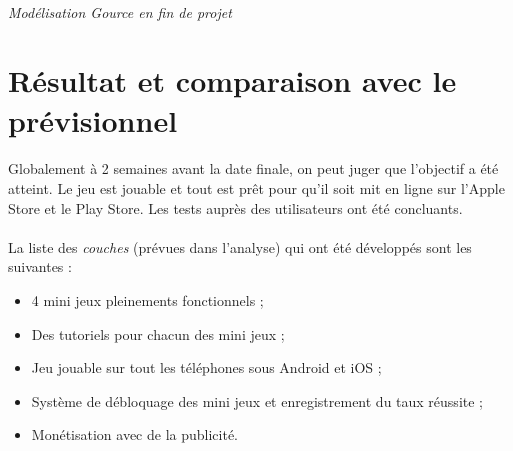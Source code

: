 \paragraph{}
\noindent
{}
\begin{center}
\textit{Modélisation Gource en fin de projet}
\end{center}

\section{Résultat et comparaison avec le prévisionnel}

\paragraph{}
Globalement à 2 semaines avant la date finale, on peut juger que l'objectif a été atteint. 
Le jeu est jouable et tout est prêt pour qu'il soit mit en ligne sur l'Apple Store et le Play Store. Les tests auprès des utilisateurs ont été concluants.

\paragraph{}
La liste des \textit{couches} (prévues dans l'analyse) qui ont été développés sont les suivantes :
\begin{itemize}
\item 4 mini jeux pleinements fonctionnels ;
\item Des tutoriels pour chacun des mini jeux ;
\item Jeu jouable sur tout les téléphones sous Android et iOS ;
\item Système de débloquage des mini jeux et enregistrement du taux réussite ;
\item Monétisation avec de la publicité.
\end{itemize}


